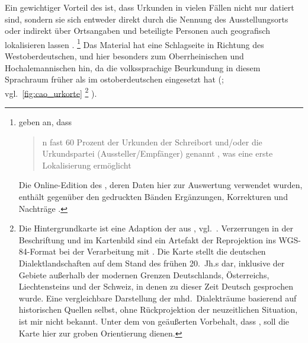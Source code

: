 Ein gewichtiger Vorteil des \CAO{} ist, dass Urkunden in vielen Fällen
nicht nur datiert sind, sondern sie sich entweder direkt durch die Nennung des
Ausstellungsorts oder indirekt über Ortsangaben und beteiligte Personen auch
geografisch lokalisieren lassen \autocite[16]{schulze2011}.%
%
	\footnote{\citet[393]{gniffkerapp2005} geben an, dass
	\blockquote{n fast 60 Prozent der Urkunden \textelp{} der
	Schreibort und/oder die Urkundspartei (Aussteller/Empfänger) genannt
	, was eine erste Lokalisierung ermöglicht}. Die
	Online-Edition des \CAO{}, deren Daten hier zur Auswertung
	verwendet wurden, enthält gegenüber den gedruckten Bänden Ergänzungen,
	Korrekturen und Nachträge \autocite[vgl.][393--394]{gniffkerapp2005}.}
%
Das Material hat eine Schlagseite in Richtung des Westoberdeutschen, und hier
besonders zum Oberrheinischen und Hochalemannischen hin, da die volkssprachige
Beurkundung in diesem Sprachraum früher als im ostoberdeutschen eingesetzt
hat (\cites[1774]{skala1985}[15]{schulze2011}; vgl.~\cref{fig:cao_urkorte}%
%
	\footnote{Die Hintergrundkarte ist eine Adaption der
		 aus \citet{wiesinger1983},
		vgl.~\citet{wiesinger1983:rede}. Verzerrungen in der Beschriftung und
		im Kartenbild sind ein Artefakt der Reprojektion ins WGS-84-Format bei
		der Verarbeitung mit . Die Karte stellt die deutschen
		Dialektlandschaften auf dem Stand des frühen 20.~Jh.s dar, inklusive
		der Gebiete außerhalb der modernen Grenzen Deutschlands, Österreichs,
		Liechtensteins und der Schweiz, in denen zu dieser Zeit Deutsch
		gesprochen wurde. Eine vergleichbare Darstellung der mhd.~Dialekträume
		basierend auf historischen Quellen selbst, ohne Rückprojektion der
		neuzeitlichen Situation, ist mir nicht bekannt. Unter dem von
		\citet[4]{paul2007} geäußerten Vorbehalt, dass , soll die Karte hier zur
		groben Orientierung dienen. }%
%
). %

